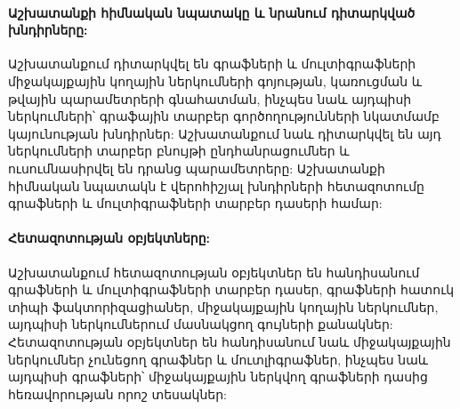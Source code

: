 
\paragraph{Աշխատանքի հիմնական նպատակը և նրանում դիտարկված խնդիրները:}
Աշխատանքում դիտարկվել են գրաֆների և մուլտիգրաֆների միջակայքային կողային ներկումների գոյության, կառուցման և թվային պարամետրերի գնահատման, ինչպես նաև այդպիսի ներկումների՝ գրաֆային տարբեր գործողությունների նկատմամբ կայունության խնդիրներ: Աշխատանքում նաև դիտարկվել են այդ ներկումների տարբեր բնույթի ընդհանրացումներ և ուսումնասիրվել են դրանց պարամետրերը: Աշխատանքի հիմնական նպատակն է վերոհիշյալ խնդիրների հետազոտումը գրաֆների և մուլտիգրաֆների տարբեր դասերի համար:


\paragraph{Հետազոտության օբյեկտները:}
Աշխատանքում հետազոտության օբյեկտներ են հանդիսանում գրաֆների և մուլտիգրաֆների տարբեր դասեր, գրաֆների հատուկ տիպի ֆակտորիզացիաներ, միջակայքային կողային ներկումներ, այդպիսի ներկումներում մասնակցող գույների քանակներ: Հետազոտության օբյեկտներ են հանդիսանում նաև միջակայքային ներկումներ չունեցող գրաֆներ և մուտլիգրաֆներ, ինչպես նաև այդպիսի գրաֆների՝ միջակայքային ներկվող գրաֆների դասից հեռավորության որոշ տեսակներ:



